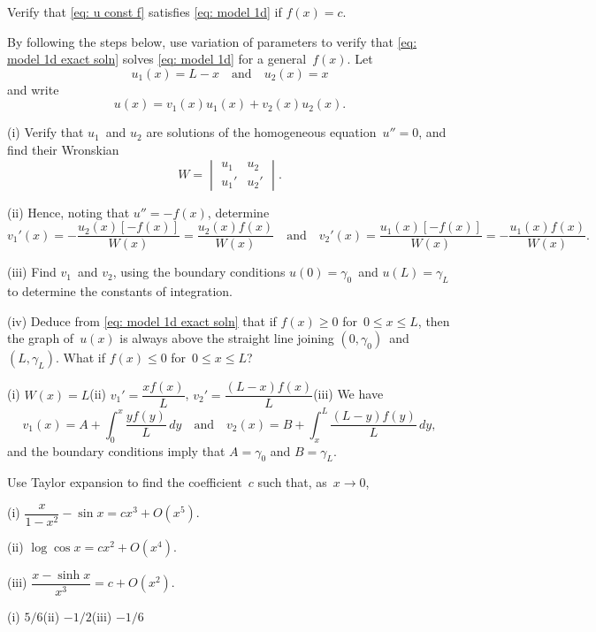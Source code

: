 \begin{Exercises}

\exercise\label{ex: u const f}
Verify that \eqref{eq: u const f} satisfies \eqref{eq: model 1d} if $f(x)=c$.

\exercise\label{ex: variation of params}
By following the steps below, use variation of parameters to  verify that 
\eqref{eq: model 1d exact soln} solves \eqref{eq: model 1d} for a 
general~$f(x)$.  Let
\[
u_1(x)=L-x\quad\text{and}\quad u_2(x)=x
\]
and write
\[
u(x)=v_1(x)u_1(x)+v_2(x)u_2(x).
\]
\begin{description}
\item{(i)} Verify that $u_1$~and $u_2$ are solutions of the homogeneous 
equation~$u''=0$, and find their Wronskian
\[
W=\begin{vmatrix}u_1&u_2\\ u_1'&u_2' \end{vmatrix}.
\]
\item{(ii)} Hence, noting that $u''=-f(x)$, determine
\[
v_1'(x)=-\frac{u_2(x)[-f(x)]}{W(x)}=\frac{u_2(x)f(x)}{W(x)}
\quad\text{and}\quad
v_2'(x)=\frac{u_1(x)[-f(x)]}{W(x)}=-\frac{u_1(x)f(x)}{W(x)}.
\]
\item{(iii)}
Find $v_1$~and $v_2$, using the boundary conditions $u(0)=\gamma_0$~and 
$u(L)=\gamma_L$ to determine the constants of integration.
\item{(iv)} Deduce from \eqref{eq: model 1d exact soln} that if $f(x)\ge0$ 
for~$0\le x\le L$, then the graph of~$u(x)$ is always above the straight line 
joining $(0,\gamma_0)$~and $(L,\gamma_L)$.  What if $f(x)\le0$ 
for~$0\le x\le L$?
\end{description}
\begin{ans}
(i) $W(x)=L$\quad (ii) $v_1'=\dfrac{xf(x)}{L}$, 
$v_2'=\dfrac{(L-x)f(x)}{L}$\quad (iii) We have
\[
v_1(x)=A+\int_0^x\frac{yf(y)}{L}\,dy
\quad\text{and}\quad
v_2(x)=B+\int_x^L\frac{(L-y)f(y)}{L}\,dy,
\]
and the boundary conditions imply that $A=\gamma_0$ and $B=\gamma_L$.
\end{ans}

\exercise
Use Taylor expansion to find the coefficient~$c$ such that, as~$x\to0$,
\begin{description}
\item{(i)}
$\dfrac{x}{1-x^2}-\sin x=cx^3+O(x^5)$.
\item{(ii)}
$\log\cos x=cx^2+O(x^4)$.
\item{(iii)}
$\dfrac{x-\sinh x}{x^3}=c+O(x^2)$.
\end{description}
\begin{ans}
(i) $5/6$\quad (ii) $-1/2$\quad (iii) $-1/6$
\end{ans}


\end{Exercises}
